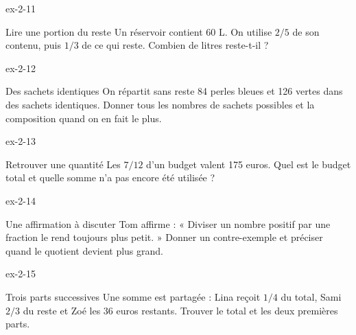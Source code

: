 \begin{blocLivre}{ex-2-11}\begin{exercice}[3]{Lire une portion du reste}
Un réservoir contient 60 L. On utilise $2/5$ de son contenu, puis $1/3$ de ce qui reste. Combien de litres reste-t-il ?
\end{exercice}\end{blocLivre}
\begin{blocLivre}{ex-2-12}\begin{exercice}[3]{Des sachets identiques}
On répartit sans reste 84 perles bleues et 126 vertes dans des sachets identiques. Donner tous les nombres de sachets possibles et la composition quand on en fait le plus.
\end{exercice}\end{blocLivre}
\begin{blocLivre}{ex-2-13}\begin{exercice}[3]{Retrouver une quantité}
Les $7/12$ d’un budget valent 175 euros. Quel est le budget total et quelle somme n’a pas encore été utilisée ?
\end{exercice}\end{blocLivre}
\begin{blocLivre}{ex-2-14}\begin{exercice}[3]{Une affirmation à discuter}
Tom affirme : « Diviser un nombre positif par une fraction le rend toujours plus petit. » Donner un contre-exemple et préciser quand le quotient devient plus grand.
\end{exercice}\end{blocLivre}
\begin{blocLivre}{ex-2-15}\begin{exercice}[3]{Trois parts successives}
Une somme est partagée : Lina reçoit $1/4$ du total, Sami $2/3$ du reste et Zoé les 36 euros restants. Trouver le total et les deux premières parts.
\end{exercice}\end{blocLivre}

\clearpage
